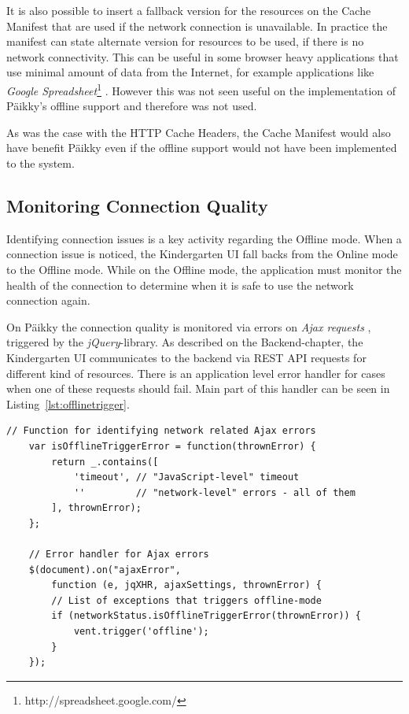It is also possible to insert a fallback version for the resources on the Cache Manifest that are used if the network connection is unavailable. In practice the manifest can state alternate version for resources to be used, if there is no network connectivity. This can be useful in some browser heavy applications that use minimal amount of data from the Internet, for example applications like \textit{Google Spreadsheet}\footnote{http://spreadsheet.google.com/} \cite{_using_????}. However this was not seen useful on the implementation of Päikky's offline support and therefore was not used. 

As was the case with the HTTP Cache Headers, the Cache Manifest would also have benefit Päikky even if the offline support would not have been implemented to the system.







\subsection{Monitoring Connection Quality}
\label{subsec:connection-monitoring}
Identifying connection issues is a key activity regarding the Offline mode. When a connection issue is noticed, the Kindergarten UI fall backs from the Online mode to the Offline mode. While on the Offline mode, the application must monitor the health of the connection to determine when it is safe to use the network connection again.

On Päikky the connection quality is monitored via errors on \textit{Ajax requests} \cite{_.ajaxerror_????}, triggered by the \textit{jQuery}-library. As described on the Backend-chapter, the Kindergarten UI communicates to the backend via REST API requests for different kind of resources. There is an application level error handler for cases when one of these requests should fail. Main part of this handler can be seen in Listing~\ref{lst:offlinetrigger}.

\begin{lstlisting}[caption={Code Snippet which triggers Päikky's Offline Mode},label={lst:offlinetrigger}]
    // Function for identifying network related Ajax errors
    var isOfflineTriggerError = function(thrownError) {
        return _.contains([
            'timeout', // "JavaScript-level" timeout
            ''         // "network-level" errors - all of them
        ], thrownError);
    };

    // Error handler for Ajax errors
    $(document).on("ajaxError",
        function (e, jqXHR, ajaxSettings, thrownError) {
        // List of exceptions that triggers offline-mode
        if (networkStatus.isOfflineTriggerError(thrownError)) {
            vent.trigger('offline');
        }
    });
\end{lstlisting}

